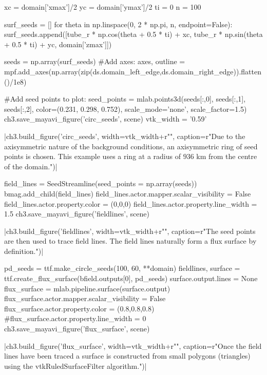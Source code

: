 \begin{pycode}[chapter3]
xc = domain['xmax']/2
yc = domain['ymax']/2
ti = 0
n = 100

surf_seeds = []
for theta in np.linspace(0, 2 * np.pi, n, endpoint=False):
    surf_seeds.append([tube_r * np.cos(theta + 0.5 * ti) + xc,
                  tube_r * np.sin(theta + 0.5 * ti) + yc, domain['zmax']])
                  
seeds = np.array(surf_seeds)
#Add axes:
axes, outline = mpf.add_axes(np.array(zip(ds.domain_left_edge,ds.domain_right_edge)).flatten()/1e8)

#Add seed points to plot:
seed_points = mlab.points3d(seeds[:,0], seeds[:,1], seeds[:,2],
                            color=(0.231, 0.298, 0.752), scale_mode='none',
                            scale_factor=1.5)
ch3.save_mayavi_figure('circ_seeds', scene)
vtk_width = '0.59'
\end{pycode}
\py[chapter3]|ch3.build_figure('circ_seeds', width=vtk_width+r"\columnwidth",
caption=r"Due to the axisymmetric nature of the background conditions, an axisymmetric ring of seed points is chosen. This example uses a ring at a radius of $936$ km from the centre of the domain.")|

\begin{pycode}[chapter3]
field_lines = SeedStreamline(seed_points = np.array(seeds))
bmag.add_child(field_lines)
field_lines.actor.mapper.scalar_visibility = False
field_lines.actor.property.color = (0,0,0)
field_lines.actor.property.line_width = 1.5
ch3.save_mayavi_figure('fieldlines', scene)
\end{pycode}
\py[chapter3]|ch3.build_figure('fieldlines', width=vtk_width+r"\columnwidth",
caption=r"The seed points are then used to trace field lines. The field lines naturally form a flux surface by definition.")|

\begin{pycode}[chapter3]
pd_seeds = ttf.make_circle_seeds(100, 60, **domain)
fieldlines, surface = ttf.create_flux_surface(bfield.outputs[0], pd_seeds)
surface.output.lines = None
flux_surface = mlab.pipeline.surface(surface.output)
flux_surface.actor.mapper.scalar_visibility = False
flux_surface.actor.property.color = (0.8,0.8,0.8)
#flux_surface.actor.property.line_width = 0
ch3.save_mayavi_figure('flux_surface', scene)
\end{pycode}
\py[chapter3]|ch3.build_figure('flux_surface', width=vtk_width+r"\columnwidth",
caption=r"Once the field lines have been traced a surface is constructed from small polygons (triangles) using the vtkRuledSurfaceFilter algorithm.")|

